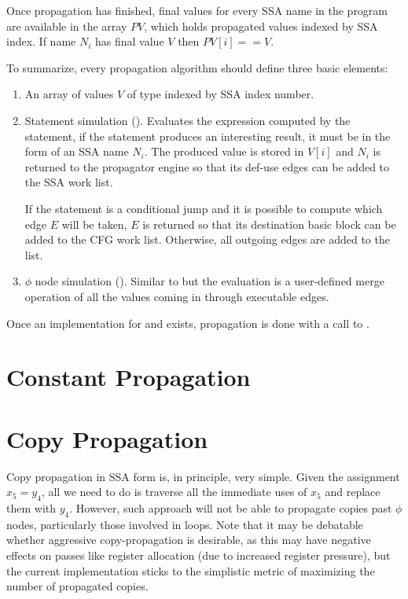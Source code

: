 Once propagation has finished, final values for every SSA name in
the program are available in the array $PV$, which holds propagated
values indexed by SSA index.  If name $N_i$ has final value $V$
then $PV[i] == V$.


To summarize, every propagation algorithm should define three
basic elements:

\begin{enumerate}
\item	An array of values $V$ of type 
	indexed by SSA index number.

\item	Statement simulation ().
	Evaluates the expression computed by the statement, if
	the statement produces an interesting result, it must be
	in the form of an SSA name $N_i$.  The produced value is
	stored in $V[i]$ and $N_i$ is returned to the propagator
	engine so that its def-use edges can be added to the SSA
	work list.

	If the statement is a conditional jump and it is possible
	to compute which edge $E$ will be taken, $E$ is returned
	so that its destination basic block can be added to the
	CFG work list.  Otherwise, all outgoing edges are added
	to the list.

\item	$\phi$ node simulation ().
	Similar to  but the
	evaluation is a user-defined merge operation of all the
	values coming in through executable edges.
\end{enumerate}

Once an implementation for  and
 exists, propagation is done with a
call to .


\section{Constant Propagation}
\label{novillo:sec:constant-prop}

\section{Copy Propagation}
\label{novillo:sec:copy-prop}

Copy propagation in SSA form is, in principle, very simple.  Given
the assignment $x_5 = y_4$, all we need to do is traverse all the
immediate uses of $x_5$ and replace them with $y_4$.  However,
such approach will not be able to propagate copies past $\phi$
nodes, particularly those involved in loops.  Note that it may be
debatable whether aggressive copy-propagation is desirable, as
this may have negative effects on passes like register allocation
(due to increased register pressure), but the current
implementation sticks to the simplistic metric of maximizing the
number of propagated copies.

